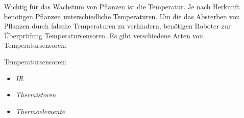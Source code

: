 Wichtig für das Wachstum von Pflanzen ist die Temperatur. Je nach
Herkunft benötigen Pflanzen unterschiedliche Temperaturen. Um die das Absterben
von Pflanzen durch falsche Temperaturen zu verhindern, benötigen Roboter zur
Überprüfung Temperatursensoren. Es gibt verschiedene Arten von
Temperatursensoren:

\begin{description}
	\item {Temperatursensoren:}
	      \begin{itemize}
		      \item {\textit{IR}}\\
					
		      \item {\textit{Thermistoren}}\\
		            
		      \item {\textit{Thermoelemente}}\\
		            
	      \end{itemize}
\end{description}